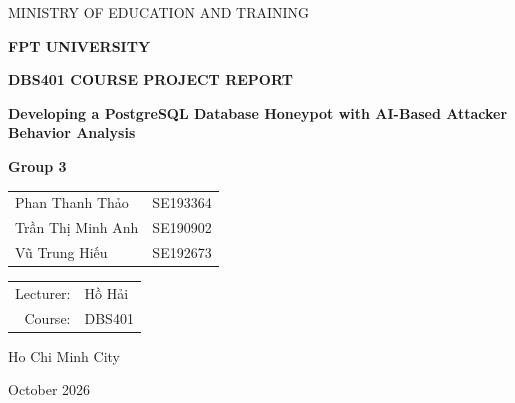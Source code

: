 \documentclass[12pt,a4paper]{report}
\begin{document}
\begin{titlepage}
    \centering
    \vspace*{0.5in}
    {\large MINISTRY OF EDUCATION AND TRAINING\par}
    \vspace{0.15in}
    {\Large\bfseries FPT UNIVERSITY\par}
    \vspace{0.75in}
    {\large\bfseries DBS401 COURSE PROJECT REPORT\par}
    \vspace{0.5in}
    {\LARGE\bfseries Developing a PostgreSQL Database Honeypot with AI-Based Attacker Behavior Analysis\par}
    \vspace{0.65in}
    {\large\bfseries Group 3\par}
    \vspace{0.2in}
    \begin{tabular}{lc}
        Phan Thanh Thảo & SE193364 \\
        Trần Thị Minh Anh & SE190902 \\
        Vũ Trung Hiếu & SE192673 \\
    \end{tabular}
    \vspace{0.45in}
    \begin{tabular}{rl}
        Lecturer: & Hồ Hải \\
        Course: & DBS401 \\
    \end{tabular}
    \vfill
    {\large Ho Chi Minh City\par}
    {\large October 2026\par}
\end{titlepage}

\end{document}
